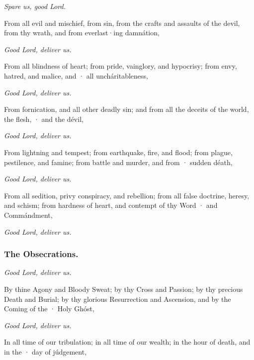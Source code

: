 
\centerline{\emph{Spare us, good Lord.}}

From all evil and mischief, from sin, from the crafts and assaults of the devil, from thy wrath, and from everlast·ing damnátion,

\centerline{\emph{Good Lord, deliver us.}}

From all blindness of heart; from pride, vainglory, and hypocrisy; from envy, hatred, and malice, and · all uncháritableness,

\centerline{\emph{Good Lord, deliver us.}}

From fornication, and all other deadly sin; and from all the deceits of the world, the flesh, · and the dévil,

\centerline{\emph{Good Lord, deliver us.}}

From lightning and tempest; from earthquake, fire, and flood; from plague, pestilence, and famine; from battle and murder, and from · sudden déath,

\centerline{\emph{Good Lord, deliver us.}}

From all sedition, privy conspiracy, and rebellion; from all false doctrine, heresy, and schism; from hardness of heart, and contempt of thy Word · and Commándment,

\centerline{\emph{Good Lord, deliver us.}}



\subsubsection{The Obsecrations.}

\centerline{\emph{Good Lord, deliver us.}}

By thine Agony and Bloody Sweat; by thy Cross and Passion; by thy precious Death and Burial; by thy glorious Resurrection and Ascension, and by the Coming of the · Holy Ghóst,

\centerline{\emph{Good Lord, deliver us.}}

In all time of our tribulation; in all time of our wealth; in the hour of death, and in the · day of júdgement,

